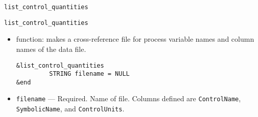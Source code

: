 \begin{itemize}
\begin{itemize}
\begin{latexonly}
\begin{center}{\Large \verb+list_control_quantities+}\end{center}
\end{latexonly}
\begin{htmlonly}
\item {\Large \verb+list_control_quantities+}
\end{htmlonly}
\begin{itemize}
        \item function: makes a cross-reference file for process variable names and column names of the data file.
\begin{verbatim}
&list_control_quantities
         STRING filename = NULL
&end
\end{verbatim}
        \item {\verb+filename+} --- Required. Name of file. Columns defined are \verb+ControlName+,
               \verb+SymbolicName+, and \verb+ControlUnits+.
\end{itemize}


\end{itemize}
\end{itemize}
